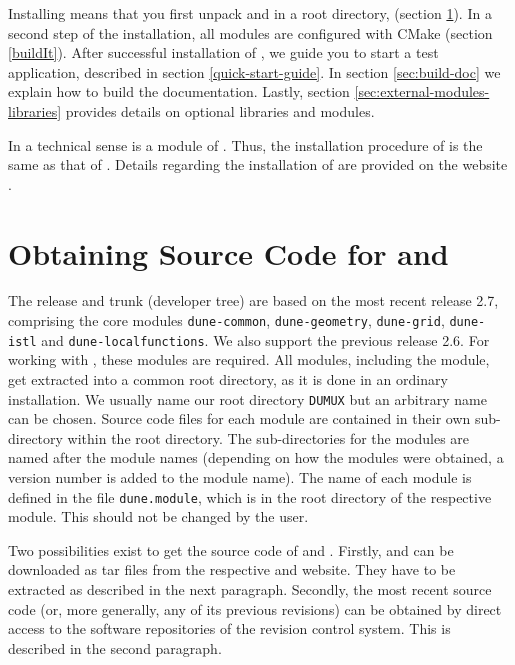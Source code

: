 Installing \Dumux means that you first unpack \Dune and \Dumux in a root directory,
(section \ref{sc:ObtainingSourceCode}).
In a second step of the installation, all modules are configured with CMake
(section \ref{buildIt}).
After successful installation of \Dumux, we guide you to start a test application,
described in section \ref{quick-start-guide}.
In section \ref{sec:build-doc} we explain how to build the \Dumux documentation.
Lastly, section \ref{sec:external-modules-libraries} provides details on optional libraries and modules.

In a technical sense \Dumux is a module of \Dune.
Thus, the installation procedure of \Dumux is the same as that of \Dune.
Details regarding the installation of \Dune are provided on the \Dune website \cite{DUNE-HP}.


\section{Obtaining Source Code for \Dune and \Dumux}
\label{sc:ObtainingSourceCode}
The \Dumux release and trunk (developer tree) are based on the most recent
\Dune release 2.7, comprising the core modules \texttt{dune-common}, \texttt{dune-geometry},
\texttt{dune-grid}, \texttt{dune-istl} and \texttt{dune-localfunctions}. We also support the previous \Dune release 2.6. 
For working with \Dumux, these modules are required.
All \Dune modules, including the \Dumux module, get extracted into a common root directory, as it
is done in an ordinary \Dune installation.
We usually name our root directory \texttt{DUMUX} but an arbitrary name can be chosen.
Source code files for each \Dune module are contained in their own sub-directory within the root directory.
The sub-directories for the modules are named after the module names (depending on how
the modules were obtained, a version number is added to the module name).
The name of each \Dune module is defined in the file \texttt{dune.module}, which is
in the root directory of the respective module. This should not be changed by the user.

Two possibilities exist to get the source code of \Dune and \Dumux.
Firstly, \Dune and \Dumux can be downloaded as tar files from the respective \Dune and \Dumux website.
They have to be extracted as described in the next paragraph.
Secondly, the most recent source code
(or, more generally, any of its previous revisions) can be obtained by direct access
to the software repositories of the revision control system. This is described in the second paragraph.

